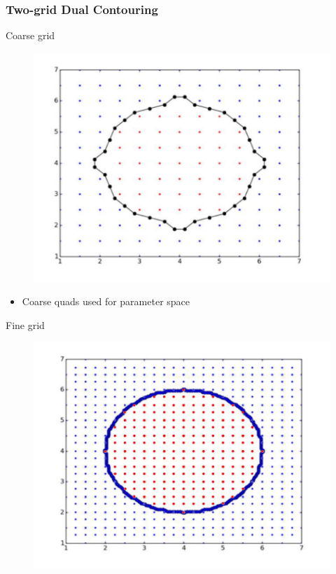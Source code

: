 \begin{frame}
	\frametitle{Two-grid Dual Contouring}
	\begin{overlayarea}{\textwidth}{0.9 \textheight}
	\begin{minipage}{0.45\textwidth}
	\begin{block}{\centering Coarse grid}
	\vspace{-0.5cm}
	\begin{figure}
	\includegraphics[scale=0.35]{Pictures/DC/DC_1_Coarse.pdf}
	\end{figure}
	\begin{itemize}
	\item Coarse quads used for parameter space
	\end{itemize}
	\end{block}
	\end{minipage}
	\hfill%
	\begin{minipage}{0.45\textwidth}
	\begin{block}{\centering Fine grid}
	\vspace{-0.5cm}
	\begin{figure}
	\includegraphics[scale=0.35]{Pictures/DC/DC_1_Fine.pdf}

\end{figure}
\end{block}
\end{minipage}
\end{overlayarea}
\end{frame}
